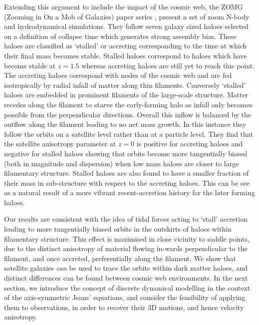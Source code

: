Extending this argument to include the impact of the cosmic web, the ZOMG (Zooming in On a Mob of Galaxies) paper series \cite{ZOMGI,ZOMGII,garaldi2018}, present a set of zoom N-body and hydrodynamical simulations. They follow seven galaxy sized haloes selected on a definition of collapse time which generates strong assembly bias. These haloes are classified as `stalled' or accreting corresponding to the time at which their final mass becomes stable. Stalled haloes correspond to haloes which have become stable at $z \sim 1.5$ whereas accreting haloes are still yet to reach this point. 
The accreting haloes correspond with nodes of the cosmic web and are fed isotropically by radial infall of matter along thin filaments. Conversely `stalled' haloes are embedded in prominent filaments of the large-scale structure. Matter recedes along the filament to starve the early-forming halo as infall only becomes possible from the perpendicular directions. Overall this inflow is balanced by the outflow along the filament leading to no net mass growth. In this instance they follow the orbits on a satellite level rather than at a particle level. They find that the satellite anisotropy parameter at $z = 0$ is positive for accreting haloes and negative for stalled haloes showing that orbits become more tangentially biased (both in magnitude and dispersion) when low mass haloes are closer to large filamentary structure. Stalled haloes are also found to have a smaller fraction of their mass in sub-structure with respect to the accreting haloes. This can be see as a natural result of a more vibrant recent-accretion history for the later forming haloes. 

Our results are consistent with the idea of tidal forces acting to `stall' accretion leading to more tangentially biased orbits in the outskirts of haloes within filamentary structure. This effect is maximised in close vicinity to saddle points, due to the distinct anisotropy of material flowing in-wards perpendicular to the filament, and once accreted, preferentially along the filament. We show that satellite galaxies \textit{can} be used to trace the orbits within dark matter haloes, and distinct differences can be found between cosmic web environments. In the next section, we introduce the concept of discrete dynamical modelling in the context of the axis-symmetric Jeans' equations, and consider the feasibility of applying them to observations, in order to recover their 3D motions, and hence velocity anisotropy.

